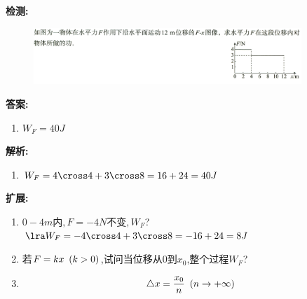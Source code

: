 \documentclass{article}
\begin{document}
\begin{itemize}
        
        \vspace{2em}

        \textbf{检测:} 
        \begin{figure}[h]
            \centering
            \includegraphics[width=0.9\textwidth]{pictures/3.png}
        \end{figure}
        
        \vspace{1em}

        \textbf{答案:} 
            \begin{enumerate}[label=(\arabic*)]
                \item[] $W_{F} = 40J $
            \end{enumerate}

        \textbf{解析:} 
            \begin{enumerate}[label=(\arabic*)]
                \item[] $W_{F} = 4 \cross 4 + 3 \cross 8 = 16 +24 = 40J $
            \end{enumerate}

        \textbf{扩展:}
            \begin{enumerate}[label=(\arabic*)]
                \item $0-4m内,F = -4 N不变,W_{F}$? $\lra W_{F} = -4 \cross 4 + 3 \cross 8 = -16 + 24 = 8J$ 
                \item 若$F = kx \hspace{0.5em} (k>0)$,试问当位移从$0$到$x_{0}$,整个过程$W_{F}$? 
                \item [] 
                $$
                \triangle x = \dfrac{x_{0}}{n} \hspace{0.5em} (n \rightarrow +\infty)
                $$
            \end{enumerate}




    \end{itemize}



    
\end{document}
